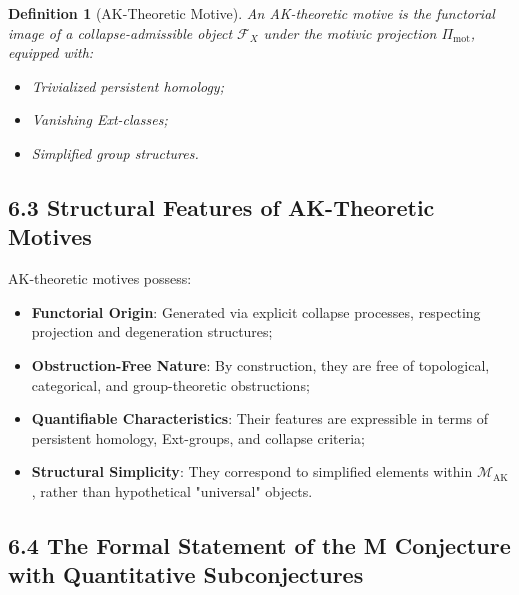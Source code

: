 \documentclass[11pt]{article}
\newtheorem{definition}[theorem]{Definition}
\begin{document}
\begin{definition}[AK-Theoretic Motive]
An \emph{AK-theoretic motive} is the functorial image of a collapse-admissible object $\mathcal{F}_X$ under the motivic projection $\Pi_{\mathrm{mot}}$, equipped with:

\begin{itemize}
    \item Trivialized persistent homology;
    \item Vanishing Ext-classes;
    \item Simplified group structures.
\end{itemize}
\end{definition}

\subsection{6.3 Structural Features of AK-Theoretic Motives}

AK-theoretic motives possess:

\begin{itemize}
    \item \textbf{Functorial Origin}: Generated via explicit collapse processes, respecting projection and degeneration structures;
    \item \textbf{Obstruction-Free Nature}: By construction, they are free of topological, categorical, and group-theoretic obstructions;
    \item \textbf{Quantifiable Characteristics}: Their features are expressible in terms of persistent homology, Ext-groups, and collapse criteria;
    \item \textbf{Structural Simplicity}: They correspond to simplified elements within $\mathcal{M}_{\mathrm{AK}}$, rather than hypothetical "universal" objects.
\end{itemize}

\subsection{6.4 The Formal Statement of the M Conjecture with Quantitative Subconjectures}
\end{document}
